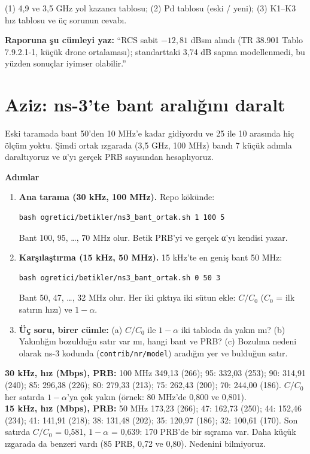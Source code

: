 \documentclass[11pt,a4paper]{article}
\begin{document}
\begin{teslim}
(1) 4,9 ve 3,5 GHz yol kazancı tablosu; (2) Pd tablosu (eski / yeni); (3) K1--K3 hız tablosu ve üç sorunun cevabı.

\textbf{Raporuna şu cümleyi yaz:} ``RCS sabit $-12{,}81$ dBsm alındı (TR 38.901 Tablo 7.9.2.1-1, küçük drone ortalaması); standarttaki 3,74 dB sapma modellenmedi, bu yüzden sonuçlar iyimser olabilir.''
\end{teslim}

\clearpage
\section*{Aziz: ns-3'te bant aralığını daralt}
\begin{amac}
Eski taramada bant 50'den 10 MHz'e kadar gidiyordu ve 25 ile 10 arasında hiç ölçüm yoktu. Şimdi ortak ızgarada (3,5 GHz, 100 MHz) bandı 7 küçük adımla daraltıyoruz ve α'yı gerçek PRB sayısından hesaplıyoruz.
\end{amac}

\textbf{Adımlar}
\begin{enumerate}[leftmargin=1.6em]
\item \textbf{Ana tarama (30 kHz, 100 MHz).} Repo kökünde:
\begin{lstlisting}
bash ogretici/betikler/ns3_bant_ortak.sh 1 100 5
\end{lstlisting}
Bant 100, 95, \ldots, 70 MHz olur. Betik PRB'yi ve gerçek α'yı kendisi yazar.
\item \textbf{Karşılaştırma (15 kHz, 50 MHz).} 15 kHz'te en geniş bant 50 MHz:
\begin{lstlisting}
bash ogretici/betikler/ns3_bant_ortak.sh 0 50 3
\end{lstlisting}
Bant 50, 47, \ldots, 32 MHz olur. Her iki çıktıya iki sütun ekle: $C/C_0$ ($C_0$ = ilk satırın hızı) ve $1 - \alpha$.
\item \textbf{Üç soru, birer cümle:} (a) $C/C_0$ ile $1 - \alpha$ iki tabloda da yakın mı? (b) Yakınlığın bozulduğu satır var mı, hangi bant ve PRB? (c) Bozulma nedeni olarak ns-3 kodunda (\texttt{contrib/nr/model}) aradığın yer ve bulduğun satır.
\end{enumerate}

\begin{kontrol}
\textbf{30 kHz, hız (Mbps), PRB:} 100 MHz 349,13 (266); 95: 332,03 (253); 90: 314,91 (240); 85: 296,38 (226); 80: 279,33 (213); 75: 262,43 (200); 70: 244,00 (186). $C/C_0$ her satırda $1 - \alpha$'ya çok yakın (örnek: 80 MHz'de 0,800 ve 0,801).\\
\textbf{15 kHz, hız (Mbps), PRB:} 50 MHz 173,23 (266); 47: 162,73 (250); 44: 152,46 (234); 41: 141,91 (218); 38: 131,48 (202); 35: 120,97 (186); 32: 100,61 (170). Son satırda $C/C_0$ = 0,581, $1 - \alpha$ = 0,639: 170 PRB'de bir sıçrama var. Daha küçük ızgarada da benzeri vardı (85 PRB, 0,72 ve 0,80). Nedenini bilmiyoruz.
\end{kontrol}
\end{document}
